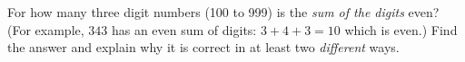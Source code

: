 \begin{questions}



\question For how many three digit numbers (100 to 999) is the {\em sum of the digits} even? (For example, $343$ has an even sum of digits: $3+4+3 = 10$ which is even.)  Find the answer and explain why it is correct in at least two {\em different} ways.


\end{questions}
